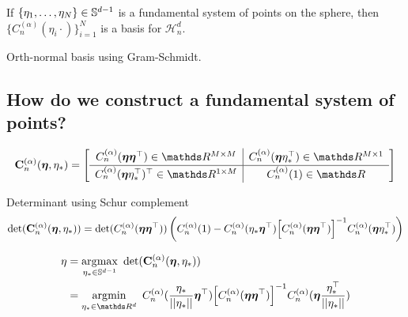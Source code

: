 \begin{theorem}
    If $\{\eta_1, \ldots, \eta_N \} \in \mathbb{S}^{d-1}$ is a fundamental system of points on the sphere, then $\{C_n^{(\alpha)}(\eta_i \cdot)\}_{i=1}^N$ is a basis for $\mathcal{H}_n^d$.
\end{theorem}

Orth-normal basis using Gram-Schmidt.

\subsection{How do we construct a fundamental system of points?}

\begin{equation}
    \renewcommand\arraystretch{1.3}
    \MC_n^{(\alpha)}(\veta, \eta_{*}) =
    \left[
        \begin{array}{c|c}
          C_n^{(\alpha)}(\veta\veta\transpose) \in \Reals^{M \times M} & C_n^{(\alpha)}(\veta\eta_{*}\transpose) \in \Reals^{M \times 1} \\
          \hline
          C_n^{(\alpha)}(\veta\eta_{*}\transpose)\transpose \in \Reals^{1 \times M} & C_n^{(\alpha)}(1) \in \Reals
        \end{array}
    \right]
\end{equation}

Determinant using Schur complement
\begin{equation}
    \textrm{det}(\MC_n^{(\alpha)}(\veta, \eta_{*})) = \textrm{det}(C_n^{(\alpha)}(\veta\veta\transpose))\,\left(C_n^{(\alpha)}(1) - C_n^{(\alpha)}(\eta_{*}\veta\transpose) \left[C_n^{(\alpha)}(\veta\veta\transpose)\right]^{-1} C_n^{(\alpha)}(\veta\eta_{*}\transpose) \right)
\end{equation}

\begin{align}
    \eta &= \argmax_{\eta_* \in \dsphere}\ \textrm{det}(\MC_n^{(\alpha)}(\veta, \eta_{*})) \\
    &= \argmin_{\eta_* \in \Reals^d}\ C_n^{(\alpha)}(\frac{\eta_{*}}{\norm{\eta_*}}\veta\transpose) \left[C_n^{(\alpha)}(\veta\veta\transpose)\right]^{-1} C_n^{(\alpha)}(\veta\frac{\eta_{*}\transpose}{\norm{\eta_*}})
\end{align}




